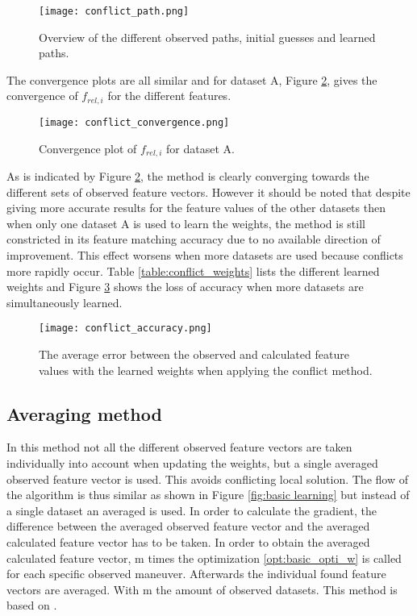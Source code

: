  
 \begin{figure}[h!]
 	\centering
 	\texttt{[image: conflict\_path.png]}
 	\caption{Overview of the different observed paths, initial guesses and learned paths.}
 	\label{fig:conflict_paths}
 \end{figure}

The convergence plots are all similar and for dataset A, Figure \ref{fig:conflict_convergence}, gives the convergence of $f_{rel,i}$ for the different features. 
 \begin{figure}[h!]
	\centering
	\texttt{[image: conflict\_convergence.png]}
	\caption{Convergence plot of $f_{rel,i}$ for dataset A.}
	\label{fig:conflict_convergence}
\end{figure}
 
 As is indicated by Figure \ref{fig:conflict_convergence}, the method is clearly converging towards the different sets of observed feature vectors. However it should be noted that despite giving more accurate results for the feature values of the other datasets then when only one dataset A is used to learn the weights, the method is still constricted in its feature matching accuracy due to no available direction of improvement. This effect worsens when more datasets are used because conflicts more rapidly occur. Table \ref{table:conflict_weights} lists the different learned weights and Figure \ref{fig:conflict_accuracy} shows the loss of accuracy when more datasets are simultaneously learned.
 
 

\begin{figure}[h!]
	\centering
	\texttt{[image: conflict\_accuracy.png]}
	\caption{The average error between the observed and calculated feature values with the learned weights when applying the conflict method.}
	\label{fig:conflict_accuracy}
\end{figure}

 \subsection{Averaging method}
 In this method not all the different observed feature vectors are taken individually into account when updating the weights, but a single averaged observed feature vector is used. This avoids conflicting local solution. The flow of the algorithm is thus similar as shown in Figure \ref{fig:basic learning} but instead of a single dataset an averaged is used. In order to calculate the gradient, the difference between the averaged observed feature vector and the averaged calculated feature vector has to be taken. In order to obtain the averaged calculated feature vector, m times the optimization \ref{opt:basic_opti_w} is called for each specific observed maneuver. Afterwards the individual found feature vectors are averaged. With m the amount of observed datasets. This method is based on \cite{Kuderer2015a}.\\
 
